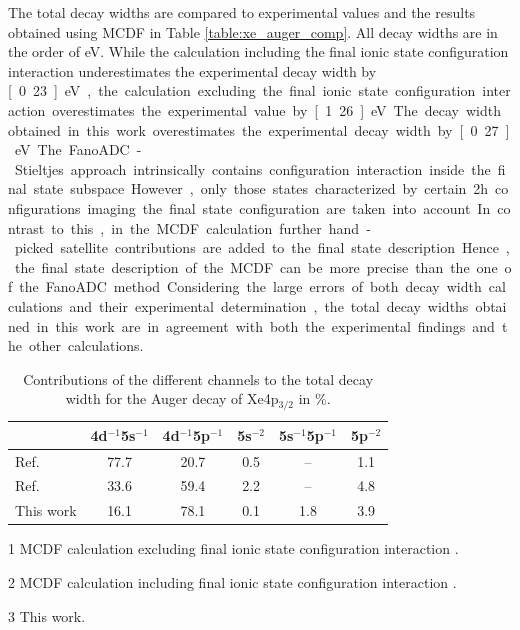The total decay widths are compared
to experimental values and the results obtained using \ac{MCDF} in
Table \ref{table:xe_auger_comp}. All decay widths are in the order of \unit[1]{eV}.
While the calculation including the final ionic state configuration interaction
underestimates
the experimental decay width by \unit[0.23]{eV}, the calculation excluding the
final ionic state configuration interaction overestimates the experimental value
by \unit[1.26]{eV}. 
The decay width obtained in this work overestimates the experimental decay width
by \unit[0.27]{eV}. 
The FanoADC-Stieltjes approach intrinsically contains configuration interaction
inside the final state subspace. However, only those states characterized by
certain 2h configurations imaging the final state configuration are taken
into account. In contrast to this, in the \ac{MCDF} calculation further hand-picked
satellite contributions are added to the final state description.
Hence, the final state description of the \ac{MCDF} can be more precise
than the one of the FanoADC method.

Considering the large errors of both decay width calculations and
their experimental determination, the total decay widths
obtained in this work are in agreement with both the experimental findings and
the other calculations.

\begin{table}[]
  \centering
  \caption{Contributions of the different channels to the total
           decay width for the Auger decay of Xe4p$_{3/2}$ in \%.}
  \begin{threeparttable}
  \begin{tabular}{lccccc}
   \toprule
                   & 4d$^{-1}$5s$^{-1}$ & 4d$^{-1}$5p$^{-1}$ & 5s$^{-2}$ & 5s$^{-1}$5p$^{-1}$ & 5p$^{-2}$ \\
   \midrule
   Ref. \tnote{1} & 77.7 & 20.7  &       0.5 &       --           & 1.1     \\
   Ref. \tnote{2} & 33.6 & 59.4  &       2.2 &       --           & 4.8     \\
   This work       &      16.1          &       78.1         &    0.1    &     1.8            & 3.9    \\
   \bottomrule
  \end{tabular}
 \begin{tablenotes}\footnotesize
  \item[1] \ac{MCDF} calculation excluding final ionic state configuration
           interaction \cite{Heinaesmaeki04}.
  \item[2]{\ac{MCDF} calculation including final ionic state configuration
                 interaction \cite{Heinaesmaeki04}.}
  \item[3]{This work.}
 \end{tablenotes}
 \end{threeparttable}
  \label{table:Xe_auger_distr}
\end{table}

